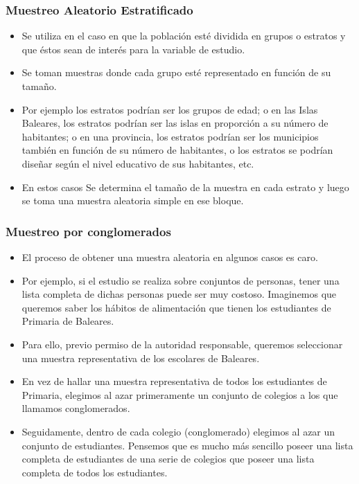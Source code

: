 \begin{frame}
\frametitle{Muestreo Aleatorio Estratificado}
\begin{itemize}
\item Se utiliza en  el caso en que la población  esté dividida en grupos o estratos y que éstos sean de interés para la variable de estudio.
\item Se toman muestras donde cada grupo esté representado en función de su tamaño. 
\item Por ejemplo los estratos podrían ser los grupos de edad; o en las Islas Baleares, los estratos podrían ser las islas en proporción a 
su número de habitantes; o en una provincia, los estratos podrían ser los municipios también en función de su número de
habitantes,
o los estratos se podrían diseñar según el nivel educativo de sus habitantes, etc.
\item En estos casos Se determina el tamaño de la muestra en cada estrato y luego se toma una muestra aleatoria simple en ese bloque.
\end{itemize}
\end{frame}

\begin{frame}  
\frametitle{Muestreo por conglomerados}
\begin{itemize}
\item El proceso de obtener una muestra aleatoria en algunos casos es caro.
\item Por ejemplo, si el estudio se realiza sobre conjuntos de personas, tener una lista completa de dichas personas puede ser muy costoso.
 Imaginemos que queremos saber los hábitos de alimentación que tienen los estudiantes de Primaria de Baleares. 
\item Para ello, previo permiso de la autoridad responsable, queremos seleccionar una muestra representativa de los escolares de Baleares. 
\item En vez de hallar una muestra representativa de todos los estudiantes de Primaria, elegimos al azar primeramente un conjunto de colegios a los que 
llamamos conglomerados.
\item Seguidamente, dentro de cada colegio (conglomerado) elegimos al azar un conjunto de estudiantes. Pensemos que es mucho más
sencillo poseer
una lista completa de estudiantes de una serie de colegios que poseer una lista completa de todos los estudiantes. 
\end{itemize}
\end{frame}

